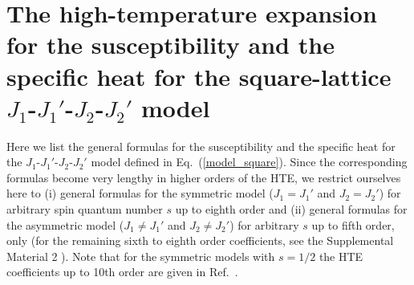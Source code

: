 \documentclass[aps,twocolumn,groupedaddress]{revtex4}
\begin{document}
\section{The high-temperature
expansion for the susceptibility and the specific heat for the square-lattice
$J_1$-$J_1'$-$J_2$-$J_2'$ model
}
\label{app_square}
Here we list the general formulas
for the susceptibility and the specific heat for the
$J_1$-$J_1'$-$J_2$-$J_2'$ model defined in Eq.~(\ref{model_square}).
Since the corresponding formulas become very lengthy in higher orders of the
HTE,
we restrict ourselves here to (i) general formulas for the symmetric model
($J_1=J_1'$ and $J_2=J_2'$) for arbitrary spin quantum number $s$
up to
eighth order and (ii) general formulas for the asymmetric model
($J_1 \ne J_1'$ and $J_2 \ne J_2'$) for arbitrary $s$ up to  fifth order,
only (for
the remaining sixth to eighth order coefficients, see the Supplemental Material
2 \cite{supp2}).
Note that for the symmetric models with $s=1/2$ the HTE coefficients up to
10th  order are given in Ref.~.
\end{document}
